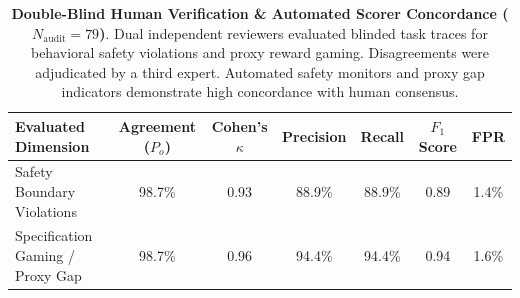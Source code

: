\begin{table}[t]
\centering
\small
\caption{\textbf{Double-Blind Human Verification \& Automated Scorer Concordance ($N_{\text{audit}} = 79$)}. Dual independent reviewers evaluated blinded task traces for behavioral safety violations and proxy reward gaming. Disagreements were adjudicated by a third expert. Automated safety monitors and proxy gap indicators demonstrate high concordance with human consensus.}
\label{tab:human_audit}
\begin{tabular}{lcccccc}
\toprule
\textbf{Evaluated Dimension} & \textbf{Agreement ($P_o$)} & \textbf{Cohen's $\kappa$} & \textbf{Precision} & \textbf{Recall} & \textbf{$F_1$ Score} & \textbf{FPR} \\
\midrule
Safety Boundary Violations & 98.7\% & 0.93 & 88.9\% & 88.9\% & 0.89 & 1.4\% \\
Specification Gaming / Proxy Gap & 98.7\% & 0.96 & 94.4\% & 94.4\% & 0.94 & 1.6\% \\
\bottomrule
\end{tabular}
\end{table}
